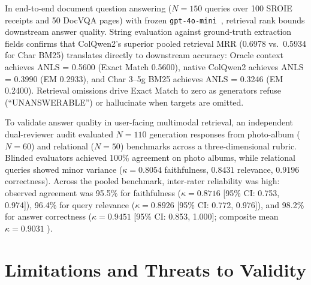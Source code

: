 In end-to-end document question answering ($N=150$ queries over 100 SROIE receipts and 50 DocVQA pages) with frozen \texttt{gpt-4o-mini}~\cite{zheng2023judging}, retrieval rank bounds downstream answer quality. String evaluation against ground-truth extraction fields confirms that ColQwen2's superior pooled retrieval MRR (0.6978 vs.\ 0.5934 for Char BM25) translates directly to downstream accuracy: Oracle context achieves ANLS = 0.5600 (Exact Match 0.5600), native ColQwen2 achieves ANLS = 0.3990 (EM 0.2933), and Char 3--5g BM25 achieves ANLS = 0.3246 (EM 0.2400). Retrieval omissions drive Exact Match to zero as generators refuse (``UNANSWERABLE'') or hallucinate when targets are omitted.

To validate answer quality in user-facing multimodal retrieval, an independent dual-reviewer audit evaluated $N=110$ generation responses from photo-album ($N=60$) and relational ($N=50$) benchmarks across a three-dimensional rubric. Blinded evaluators achieved 100\% agreement on photo albums, while relational queries showed minor variance ($\kappa = 0.8054$ faithfulness, $0.8431$ relevance, $0.9196$ correctness). Across the pooled benchmark, inter-rater reliability was high: observed agreement was 95.5\% for faithfulness ($\kappa = 0.8716$ [95\% CI: 0.753, 0.974]), 96.4\% for query relevance ($\kappa = 0.8926$ [95\% CI: 0.772, 0.976]), and 98.2\% for answer correctness ($\kappa = 0.9451$ [95\% CI: 0.853, 1.000]; composite mean $\kappa = 0.9031$ \cite{cohen1960coefficient}).

\vspace{3.5mm}
\section{Limitations and Threats to Validity}
\label{sec:limitations}

